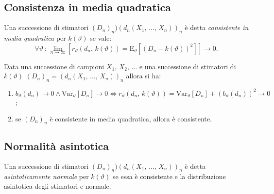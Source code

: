         \subsection{Consistenza in media quadratica}
            \begin{defn}
                Una successione di stimatori $(D_n)_n ) (d_n(X_1,\, \ldots,\, X_{n}))_n$ è detta 
                \emph{consistente in media quadratica} per $k(\vartheta)$ se vale: \[
                    \forall \vartheta \,:\, \lim_{n \to \infty} \left[r_{\vartheta}(d_n,\, k(\vartheta))
                    = \text{E}_{\vartheta}[(D_n - k(\vartheta))^2]\right] \rightarrow 0
                .\] 
            \end{defn}
            \begin{prty}
                Data una successione di campioni $X_1,\, X_2,\, \ldots$ e una successione di stimatori 
                di $k(\vartheta)$ $(D_n)_n = (d_n(X_1,\, \ldots,\, X_{n}))_n$ allora si ha:
                \begin{enumerate}
                    \item $b_{\vartheta}(d_n) \rightarrow 0 \land \text{Var}_{\vartheta}[D_n] \rightarrow 0 
                        \iff r_{\vartheta}(d_n,\, k(\vartheta)) = \text{Var}_{\vartheta}[D_n] + 
                        (b_{\vartheta}(d_n))^2 \rightarrow 0$;
                    \item se  $(D_n)_n$ è consistente in media quadratica, allora è consistente.
                \end{enumerate}
            \end{prty}
        \subsection{Normalità asintotica}
            \begin{defn}
                Una successione di stimatori $(D_n)_n ) (d_n(X_1,\, \ldots,\, X_{n}))_n$ è detta 
                \emph{asintoticamente normale} per $k(\vartheta)$ se essa è consistente e 
                la distribuzione asintotica degli stimatori e normale.
            \end{defn}
